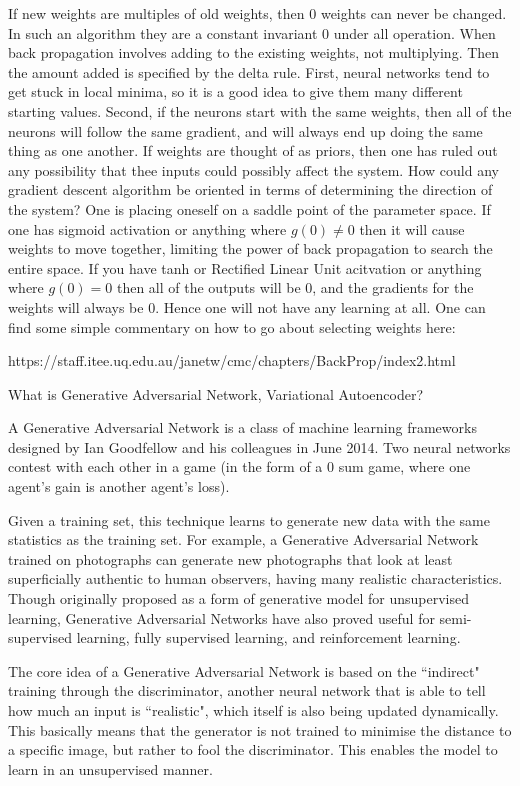 If new weights are multiples of old weights, then $0$ weights can never be changed. In such an algorithm they are a constant invariant $0$ under all operation. When back propagation involves adding to the existing weights, not multiplying. Then the amount added is specified by the delta rule. First, neural networks tend to get stuck in local minima, so it is a good idea to give them many different starting values. Second, if the neurons start with the same weights, then all of the neurons will follow the same gradient, and will always end up doing the same thing as one another. If weights are thought of as priors, then one has ruled out any possibility that thee inputs could possibly affect the system. How could any gradient descent algorithm be oriented in terms of determining the direction of the system? One is placing oneself on a saddle point of the parameter space. If one has sigmoid activation or anything where $g(0) \neq 0$ then it will cause weights to move together, limiting the power of back propagation to search the entire space. If you have tanh or Rectified Linear Unit acitvation or anything where $g(0) = 0$ then all of the outputs will be $0$, and the gradients for the weights will always be $0$. Hence one will not have any learning at all. One can find some simple commentary on how to go about selecting weights here:

https://staff.itee.uq.edu.au/janetw/cmc/chapters/BackProp/index2.html

What is Generative Adversarial Network, Variational Autoencoder?

A Generative Adversarial Network is a class of machine learning frameworks designed by Ian Goodfellow and his colleagues in June 2014. Two neural networks contest with each other in a game (in the form of a $0$ sum game, where one agent's gain is another agent's loss).

Given a training set, this technique learns to generate new data with the same statistics as the training set. For example, a Generative Adversarial Network trained on photographs can generate new photographs that look at least superficially authentic to human observers, having many realistic characteristics. Though originally proposed as a form of generative model for unsupervised learning, Generative Adversarial Networks have also proved useful for semi-supervised learning, fully supervised learning, and reinforcement learning.

The core idea of a Generative Adversarial Network is based on the ``indirect" training through the discriminator, another neural network that is able to tell how much an input is ``realistic", which itself is also being updated dynamically. This basically means that the generator is not trained to minimise the distance to a specific image, but rather to fool the discriminator. This enables the model to learn in an unsupervised manner.

